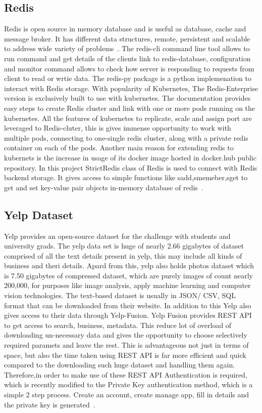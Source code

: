 \subsection{Redis}

Redis is open source in memory database and is useful as database,
cache and message broker. It has different data structures, remote,
persistent and scalable to address wide variety of
problems~\cite{hid-sp18-602-redis}. The redis-cli command line tool
allows to run command and get details of the clients link to
redis-database, configuration and monitor command allows to check how
server is responding to requests from client to read or wrtie
data. The redis-py package is a python implemenation to interact with
Redis storage. With popularity of Kubernetes, The Redis-Enterprise
version is exclusively built to use with kubernetes. The documentation
provides easy steps to create Redis cluster and link with one or more
pods running on the kubernetes. All the features of kubernetes to
replicate, scale and assign port are leveraged to Redis-cluter, this
is gives immense opportunity to work with multiple pods, connecting to
one-single redis cluster, along with a private redis container on each
of the pods. Another main reason for extending redis to kubernets is
the increase in usage of its docker image hosted in docker.hub public
repository. In this project StrictRedis class of Redis is used to
connect with Redis backend storage. It gives access to simple
functions like sadd,smemeber,sget to get and set key-value pair
objects in-memory database of redis~\cite{hid-sp18-602-redis}.

\subsection{Yelp Dataset}

Yelp provides an open-source dataset for the challenge with students
and university grads. The yelp data set is huge of nearly 2.66
gigabytes of dataset comprised of all the text details present in
yelp, this may include all kinds of business and theri details. Apard
from this, yelp also holds photos dataset which is 7.50 gigabytes of
compressed dataset, which are purely images of count nearly 200,000,
for purposes like image analysis, apply machine learning and computer
vision technologies. The text-based dataset is usually in JSON/ CSV,
SQL format that can be downloaded from their website. In addition to
this Yelp also gives access to their data through Yelp-Fusion. Yelp
Fusion provides REST API to get access to search, business,
metadata. This reduce lot of overload of downloading un-necessary data
and gives the opportunity to choose selectively required paramets and
leave the rest. This is advantageous not just in terms of space, but
also the time taken using REST API is far more efficient and quick
compared to the downloading such huge dataset and handling them
again. Therefore,in order to make use of these REST API Authentication
is required, which is recently modified to the Private Key
authentication method, which is a simple 2 step process. Create an
account, create manage app, fill in details and the private key is
generated~\cite{hid-sp18-602-yelp}.

